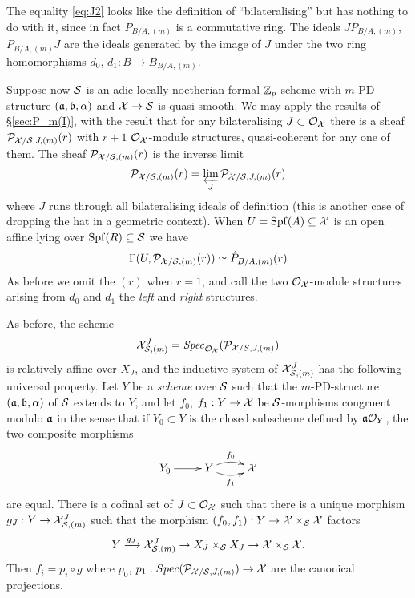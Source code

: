 \documentclass{article}
\theoremstyle{change}
\numberwithin{equation}{subsubsection}
\newenvironment{remark}{\medskip\noindent{\textit{Remark.}}}{\medskip}
\begin{document}
\begin{remark}
  The equality \ref{eq:J2} looks like the definition of
  ``bilateralising'' but has nothing to do with it, since in fact
  $P_{B/A,(m)}$ is a commutative ring. The ideals $JP_{B/A,(m)}$,
  $P_{B/A,(m)}J$ are the ideals generated by the image of $J$ under
  the two ring homomorphisms $d_0$, $d_1:B\to B_{B/A,(m)}$.
\end{remark}

Suppose now ${\cal S}$ is an adic locally noetherian formal ${\mathbb Z}_p$-scheme
with $m$-PD-structure $({\mathfrak a},{\mathfrak b},\alpha)$ and ${\cal X}\to{\cal S}$ is
quasi-smooth. We may apply the results of \S\ref{sec:P_m(I)}, with the
result that for any bilateralising $J\subset{\cal O}_{\cal X}$ there is a sheaf
${\cal P}_{{\cal X}/{\cal S},J,(m)}(r)$ with $r+1$ ${\cal O}_{\cal X}$-module structures,
quasi-coherent for any one of them. The sheaf ${\cal P}_{{\cal X}/{\cal S},(m)}(r)$
is the inverse limit
\begin{equation}
  \label{eq:P_X/S,m}
  {\cal P}_{{\cal X}/{\cal S},(m)}(r)=\varprojlim_J{\cal P}_{{\cal X}/{\cal S},J,(m)}(r)
\end{equation}
where $J$ runs through all bilateralising ideals of definition (this
is another case of dropping the hat in a geometric context). When
$U={\operatorname{Spf}({A})}\subseteq{\cal X}$ is an open affine lying over ${\operatorname{Spf}({R})}\subseteq{\cal S}$ we
have
\begin{equation}
  \label{eq:P_X/S,m}
  \Gamma(U,{\cal P}_{{\cal X}/{\cal S},(m)}(r))\simeq\hat P_{B/A,(m)}(r)
\end{equation}
As before we omit the $(r)$ when $r=1$, and call the two
${\cal O}_{\cal X}$-module structures arising from $d_0$ and $d_1$ the
\textit{left} and \textit{right} structures.

As before, the scheme
\begin{displaymath}
  {\cal X}^J_{{\cal S},(m)}=\mathit{Spec}_{{\cal O}_{\cal X}}({\cal P}_{{\cal X}/{\cal S},J,(m)})
\end{displaymath}
is relatively affine over $X_J$, and the inductive system of
${\cal X}^J_{{\cal S},(m)}$ has the following universal property. Let $Y$ be a
\textit{scheme} over ${\cal S}$ such that the $m$-PD-structure
$({\mathfrak a},{\mathfrak b},\alpha)$ of ${\cal S}$ extends to $Y$, and let $f_0$,
$f_1:Y\to{\cal X}$ be ${\cal S}$-morphisms congruent modulo ${\mathfrak a}$ in the sense
that if $Y_0\subset Y$ is the closed subscheme defined by ${\mathfrak a}{\cal O}_Y$,
the two composite morphisms
\begin{displaymath}
  \xymatrix{
    Y_0\ar[r]&Y\ar@/^/[r]^{f_0}\ar@/_/[r]_{f_1}&\cX
  }
\end{displaymath}
are equal. There is a cofinal set of $J\subset{\cal O}_{\cal X}$ such that there
is a unique morphism $g_J:Y\to{\cal X}^J_{{\cal S},(m)}$ such
that the morphism $(f_0,f_1):Y\to{\cal X}\times_{\cal S}{\cal X}$ factors
\begin{displaymath}
  Y\xrightarrow{g_J}{\cal X}^J_{{\cal S},(m)}\to X_J\times_{\cal S} X_J
  \to{\cal X}\times_{\cal S}{\cal X}.
\end{displaymath}
Then $f_i=p_i\circ g$ where $p_0$,
$p_1:Spec({\cal P}_{{\cal X}/{\cal S},J,(m)})\to{\cal X}$ are the canonical
projections.
\end{document}
